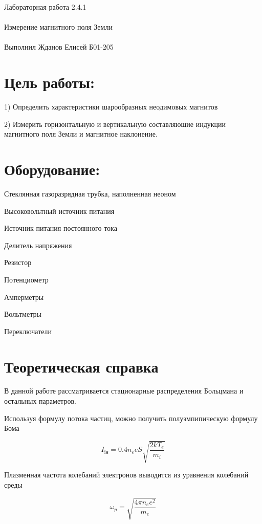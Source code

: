 \documentclass{astroedu-lab}
\begin{document}
\pagestyle{plain}

\begin{problem}{\huge Лабораторная работа 2.4.1\\\\Измерение магнитного поля Земли\\\\Выполнил Жданов Елисей Б01-205}

\section{Цель работы:}

1) Определить характеристики шарообразных неодимовых магнитов 

2) Измерить горизонтальную и вертикальную составляющие индукции магнитного поля Земли и магнитное наклонение.

\section{Оборудование:}

Стеклянная газоразрядная трубка, наполненная неоном

Высоковольтный источник питания

Источник питания постоянного тока

Делитель напряжения

Резистор

Потенциометр

Амперметры

Вольтметры

Переключатели

\section{Теоретическая справка}

В данной работе рассматривается стационарные распределения Больцмана и остальных параметров.

Используя формулу потока частиц, можно получить полуэмпипическую формулу Бома

\begin{equation}
	I_\text{iн} = 0.4 n_e e S \sqrt{\frac{2 k T_e}{m_i}}
\end{equation}

Плазменная частота колебаний электронов выводится из уравнения колебаний среды

\begin{equation}
	\omega_p = \sqrt{\frac{4 \pi n_e e^2}{m_e}}
\end{equation}


\end{problem}
\end{document}
